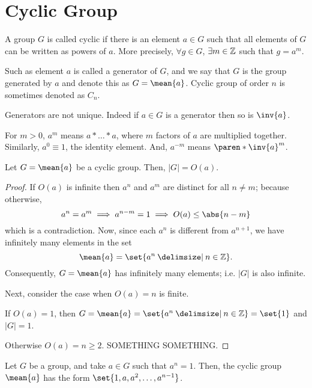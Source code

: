 \documentclass[11pt]{penrose}
\newcommand{\cyclic}[1]{\mean{#1}}
\begin{document}
\section{Cyclic Group}
\begin{ndfn}
    A group $G$ is called cyclic if there is an element $a \in G$ such that all elements of $G$ can be written as powers of $a$. More precisely, $\forall g \in G$, $\exists m \in \mathbb{Z}$ such that $g = a^m$.

    Such as element $a$ is called a generator of $G$, and we say that $G$ is the group generated by $a$ and denote this as $G = \cyclic{a}$. Cyclic group of order $n$ is sometimes denoted as $C_n$.
\end{ndfn}

Generators are not unique. Indeed if $a \in G$ is a generator then so is $\inv{a}$.

\begin{notation}
    For $m > 0$, $a^m$ means $a * \dots * a$, where $m$ factors of $a$ are multiplied together. Similarly, $a^0 \equiv 1$, the identity element. And, $a^{-m}$ means $\paren*{\inv{a}}^m$.
\end{notation}

\begin{nthm}
    Let $G = \cyclic{a}$ be a cyclic group. Then, $|G| = O(a)$.
\end{nthm}
\begin{proof}
    If $O(a)$ is infinite then $a^n$ and $a^m$ are distinct for all $n \neq m$; because otherwise,
    \begin{equation*}
        a^n = a^m \implies a^{n - m} = 1 \implies O(a) \leq \abs{n-m}
    \end{equation*}
    which is a contradiction. Now, since each $a^n$ is different from $a^{n+1}$, we have infinitely many elements in the set
    \begin{equation*}
        \cyclic{a} = \set{a^n \st n \in \Z}.
    \end{equation*}
    Consequently, $G = \cyclic{a}$ has infinitely many elements; i.e. $|G|$ is also infinite.

    Next, consider the case when $O(a) = n$ is finite.

    If $O(a) = 1$, then $G = \cyclic{a} = \set{a^n \st n \in \Z} = \set{1}$ and $|G| = 1$.

    Otherwise $O(a) = n \geq 2$. SOMETHING SOMETHING.
\end{proof}

\begin{nthm}
    Let $G$ be a group, and take $a \in G$ such that $a^n = 1$. Then, the cyclic group $\cyclic{a}$ has the form $\set{1, a, a^2, \dots, a^{n-1}}$.
\end{nthm}
\end{document}
